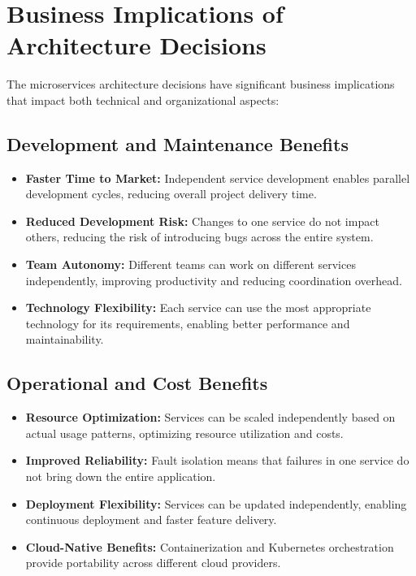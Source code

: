 \documentclass[conference]{IEEEtran}
\begin{document}
\section{\textbf{Business Implications of Architecture Decisions}}
The microservices architecture decisions have significant business implications that impact both technical and organizational aspects:

\subsection{Development and Maintenance Benefits}
\begin{itemize}
  \item \textbf{Faster Time to Market:} Independent service development enables parallel development cycles, reducing overall project delivery time.
  \item \textbf{Reduced Development Risk:} Changes to one service do not impact others, reducing the risk of introducing bugs across the entire system.
  \item \textbf{Team Autonomy:} Different teams can work on different services independently, improving productivity and reducing coordination overhead.
  \item \textbf{Technology Flexibility:} Each service can use the most appropriate technology for its requirements, enabling better performance and maintainability.
\end{itemize}

\subsection{Operational and Cost Benefits}
\begin{itemize}
  \item \textbf{Resource Optimization:} Services can be scaled independently based on actual usage patterns, optimizing resource utilization and costs.
  \item \textbf{Improved Reliability:} Fault isolation means that failures in one service do not bring down the entire application.
  \item \textbf{Deployment Flexibility:} Services can be updated independently, enabling continuous deployment and faster feature delivery.
  \item \textbf{Cloud-Native Benefits:} Containerization and Kubernetes orchestration provide portability across different cloud providers.
\end{itemize}
\end{document}
